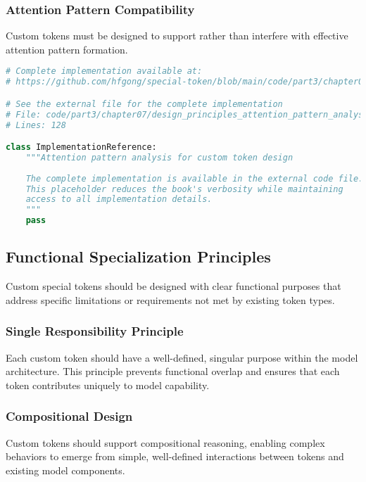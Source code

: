 \subsubsection{Attention Pattern Compatibility}

Custom tokens must be designed to support rather than interfere with effective attention pattern formation.

\begin{lstlisting}[language=Python, caption={Attention pattern analysis for custom token design}]
# Complete implementation available at:
# https://github.com/hfgong/special-token/blob/main/code/part3/chapter07/design_principles_attention_pattern_analysis_for.py

# See the external file for the complete implementation
# File: code/part3/chapter07/design_principles_attention_pattern_analysis_for.py
# Lines: 128

class ImplementationReference:
    """Attention pattern analysis for custom token design
    
    The complete implementation is available in the external code file.
    This placeholder reduces the book's verbosity while maintaining
    access to all implementation details.
    """
    pass
\end{lstlisting}

\subsection{Functional Specialization Principles}

Custom special tokens should be designed with clear functional purposes that address specific limitations or requirements not met by existing token types.

\subsubsection{Single Responsibility Principle}

Each custom token should have a well-defined, singular purpose within the model architecture. This principle prevents functional overlap and ensures that each token contributes uniquely to model capability.

\subsubsection{Compositional Design}

Custom tokens should support compositional reasoning, enabling complex behaviors to emerge from simple, well-defined interactions between tokens and existing model components.

